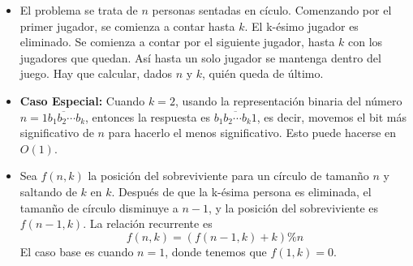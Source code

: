 \begin{itemize}
    \item{
         El problema se trata de $n$ personas sentadas en c\'iculo. Comenzando por el primer jugador,
         se comienza a contar hasta $k$. El k-\'esimo jugador es eliminado. Se comienza a contar por el siguiente 
         jugador, hasta $k$ con los jugadores que quedan. As\'i hasta un solo jugador se mantenga dentro 
         del juego. Hay que calcular, dados $n$ y $k$, qui\'en queda de \'ultimo.       
    }
    \item{
		\textbf{Caso Especial:}
		Cuando $k=2$, usando la representaci\'on binaria del n\'umero $n = \overline{1b_1 b_2 \cdots b_k}$,
		entonces la respuesta es $\overline{b_1 b_2 \cdots b_k 1}$, es decir, movemos el bit m\'as significativo
		de $n$ para hacerlo el menos significativo. Esto puede hacerse en $O(1)$.  
    }
    \item{
		Sea $f(n, k)$ la posici\'on del sobreviviente para un c\'irculo de taman\~no $n$ y saltando de $k$ en
		$k$. Despu\'es de que la k-\'esima persona es eliminada, el taman\~no de c\'irculo disminuye a $n-1$, 
		y la posici\'on del sobreviviente es $f(n-1, k)$. La relaci\'on recurrente es
		$$ f(n, k) = (f(n-1, k) + k) \% n $$
		El caso base es cuando $n=1$, donde tenemos que $f(1, k) = 0$.  
    }
\end{itemize}
